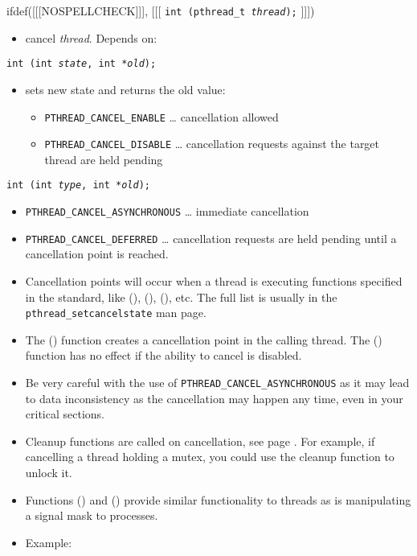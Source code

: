 \begin{slide}
\setlength{\baselineskip}{0.9\baselineskip}
ifdef([[[NOSPELLCHECK]]], [[[
\texttt{int (pthread\_t \emph{thread});}
]]])
\begin{itemize}
\item cancel \emph{thread}.  Depends on:
\end{itemize}
\texttt{int (int \emph{state},
int *\emph{old});}
\begin{itemize}
\item sets new state and returns the old value:
    \begin{itemize}
    \item \texttt{PTHREAD\_CANCEL\_ENABLE} \dots{} cancellation allowed
    \item \texttt{PTHREAD\_CANCEL\_DISABLE} \dots{} cancellation requests
    against the target thread are held pending
    \end{itemize}
\end{itemize}
\texttt{int (int \emph{type}, int *\emph{old});}
\begin{itemize}
\item \texttt{PTHREAD\_CANCEL\_ASYNCHRONOUS} \dots{} immediate cancellation
\item \texttt{PTHREAD\_CANCEL\_DEFERRED} \dots{} cancellation requests are held
pending until a cancellation point is reached.
\end{itemize}
\end{slide}

\begin{itemize}
\item Cancellation points will occur when a thread is executing functions
specified in the standard, like (), (),
(), etc.  The full list is usually in the
\texttt{pthread\_setcancelstate} man page.
\item The () function creates a cancellation point in
the calling thread.  The () function has no effect if
the ability to cancel is disabled.
\item Be very careful with the use of \texttt{PTHREAD\_CANCEL\_ASYNCHRONOUS} as
it may lead to data inconsistency as the cancellation may happen any time, even
in your critical sections.
\item Cleanup functions are called on cancellation, see page
\pageref{PTHREAD_CLEANUP}.  For example, if cancelling a thread holding a mutex,
you could use the cleanup function to unlock it.
\item Functions () and
() provide similar functionality to threads as is
manipulating a signal mask to processes.
\item \label{PTHREAD_CANCEL} Example: 
\end{itemize}

